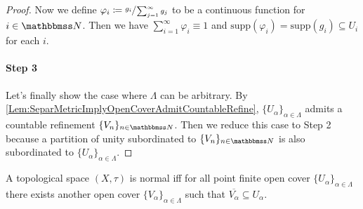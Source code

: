 \documentclass[screen,single]{techreport}
\numberwithin{equation}{section}
\begin{document}
\begin{proof}
  Now we define $\varphi_i \coloneqq \sfrac{g_i}{\sum_{j=1}^\infty g_j}$ to be a continuous function for $i \in \bbN$.
  Then we have $\sum_{i=1}^\infty \varphi_i \equiv 1$ and $\mathrm{supp}(\varphi_i) = \mathrm{supp}(g_i) \subseteq U_i$ for each $i$.
  
  \paragraph{Step 3}
  Let's finally show the case where $\Lambda$ can be arbitrary.
  By \cref{Lem:SeparMetricImplyOpenCoverAdmitCountableRefine}, $\{U_\alpha\}_{\alpha \in \Lambda}$ admits a countable refinement $\{V_n\}_{n \in \bbN}$.
  Then we reduce this case to Step 2 because a partition of unity subordinated to $\{V_n\}_{n \in \bbN}$ is also subordinated to $\{U_\alpha\}_{\alpha \in \Lambda}$.
\end{proof}

\begin{lemma}\label{Lem:NormalIffAnyPointFinCoverAdmitClosRefineCover}
  A topological space $(X,\tau)$ is normal iff for all point finite open cover $\{U_\alpha\}_{\alpha \in \Lambda}$ there exists another open cover $\{V_\alpha\}_{\alpha \in \Lambda}$ such that $\overline{V_\alpha} \subseteq U_\alpha$.
\end{lemma}
\end{document}
